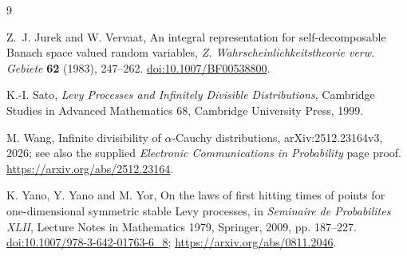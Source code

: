 \documentclass[11pt]{article}
\theoremstyle{remark}
\begin{document}
\begin{thebibliography}{9}

Z.~J. Jurek and W. Vervaat,
\newblock An integral representation for self-decomposable Banach
space valued random variables,
\newblock \emph{Z. Wahrscheinlichkeitstheorie verw. Gebiete}
\textbf{62} (1983), 247--262.
\newblock \href{https://doi.org/10.1007/BF00538800}
{doi:10.1007/BF00538800}.

K.-I. Sato,
\newblock \emph{Levy Processes and Infinitely Divisible
Distributions},
\newblock Cambridge Studies in Advanced Mathematics 68,
Cambridge University Press, 1999.

M. Wang,
\newblock Infinite divisibility of $\alpha$-Cauchy distributions,
\newblock arXiv:2512.23164v3, 2026; see also the supplied
\emph{Electronic Communications in Probability} page proof.
\newblock \url{https://arxiv.org/abs/2512.23164}.

K. Yano, Y. Yano and M. Yor,
\newblock On the laws of first hitting times of points for
one-dimensional symmetric stable Levy processes,
\newblock in \emph{Seminaire de Probabilites XLII},
Lecture Notes in Mathematics 1979, Springer, 2009, pp. 187--227.
\newblock \href{https://doi.org/10.1007/978-3-642-01763-6_8}
{doi:10.1007/978-3-642-01763-6\_8};
\url{https://arxiv.org/abs/0811.2046}.

\end{thebibliography}
\end{document}
